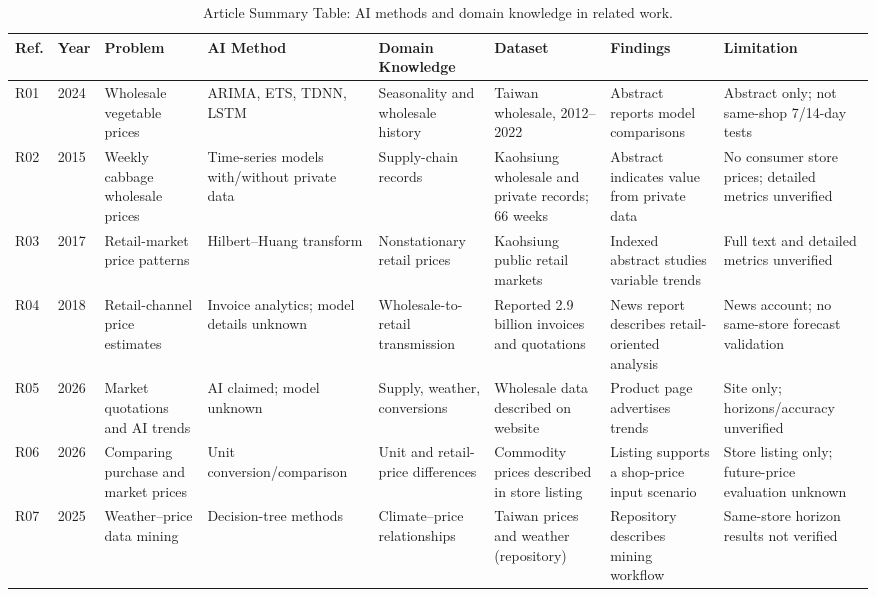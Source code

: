 \documentclass[conference]{IEEEtran}
\begin{document}
\begin{table}[!t]
\centering
\caption{Article Summary Table: AI methods and domain knowledge in related work.}
\label{tab:article-summary}
\setlength{\tabcolsep}{2.2pt}
\renewcommand{\arraystretch}{1.14}
\fontsize{7.6}{8.8}\selectfont
\begin{tabularx}{\textwidth}{@{}P{0.060\textwidth}P{0.045\textwidth}P{0.115\textwidth}P{0.113\textwidth}P{0.131\textwidth}P{0.132\textwidth}YY@{}}
\toprule
Ref. & Year & Problem & AI Method & Domain Knowledge & Dataset & Findings & Limitation\\
\midrule
R01 \cite{chen2024} & 2024 & Wholesale vegetable prices & ARIMA, ETS, TDNN, LSTM & Seasonality and wholesale history & Taiwan wholesale, 2012--2022 & Abstract reports model comparisons & Abstract only; not same-shop 7/14-day tests\\
R02 \cite{lee2015} & 2015 & Weekly cabbage wholesale prices & Time-series models with/without private data & Supply-chain records & Kaohsiung wholesale and private records; 66 weeks & Abstract indicates value from private data & No consumer store prices; detailed metrics unverified\\
R03 \cite{lin2017} & 2017 & Retail-market price patterns & Hilbert--Huang transform & Nonstationary retail prices & Kaohsiung public retail markets & Indexed abstract studies variable trends & Full text and detailed metrics unverified\\
R04 \cite{agri2018} & 2018 & Retail-channel price estimates & Invoice analytics; model details unknown & Wholesale-to-retail transmission & Reported 2.9 billion invoices and quotations & News report describes retail-oriented analysis & News account; no same-store forecast validation\\
R05 \cite{cabbage2026} & 2026 & Market quotations and AI trends & AI claimed; model unknown & Supply, weather, conversions & Wholesale data described on website & Product page advertises trends & Site only; horizons/accuracy unverified\\
R06 \cite{farmapp2026} & 2026 & Comparing purchase and market prices & Unit conversion/comparison & Unit and retail-price differences & Commodity prices described in store listing & Listing supports a shop-price input scenario & Store listing only; future-price evaluation unknown\\
R07 \cite{nchudm2025} & 2025 & Weather--price data mining & Decision-tree methods & Climate--price relationships & Taiwan prices and weather (repository) & Repository describes mining workflow & Same-store horizon results not verified\\

\end{tabularx}
\end{table}
\end{document}
